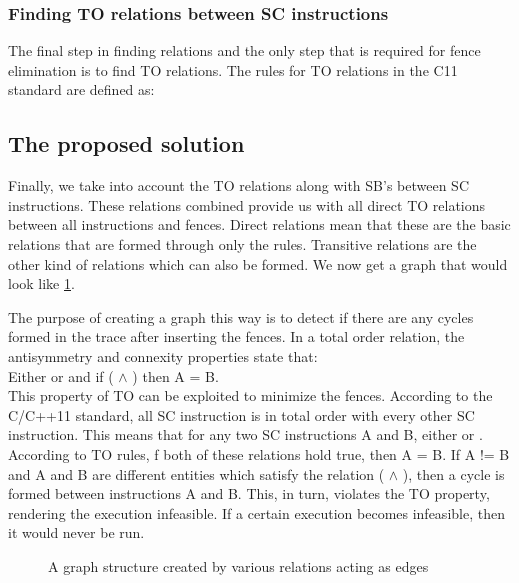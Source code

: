 \subsubsection{Finding TO relations between SC instructions}
The final step in finding relations and the only step that is required for fence elimination is to find TO relations. The rules for TO relations in the C11 standard are defined as:


\subsection{The proposed solution}
Finally, we take into account the TO relations along with SB's between SC instructions. These relations combined provide us with all direct TO relations between all instructions and fences. Direct relations mean that these are the basic relations that are formed through only the rules. Transitive relations are the other kind of relations which can also be formed. We now get a graph that would look like \ref{fig:cycles}.

\par
The purpose of creating a graph this way is to detect if there are any cycles formed in the trace after inserting the fences. In a total order relation, the antisymmetry and connexity properties state that:\\
Either  or  and if ( $\land$ ) then A = B.\\
This property of TO can be exploited to minimize the fences. According to the C/C++11 standard, all SC instruction is in total order with every other SC instruction. This means that for any two SC instructions A and B, either  or . According to TO rules, f both of these relations hold true, then A = B. If A != B and A and B are different entities which satisfy the relation ( $\land$ ), then a cycle is formed between instructions A and B. This, in turn, violates the TO property, rendering the execution infeasible. If a certain execution becomes infeasible, then it would never be run. 

\begin{figure}
\begin{center}
	
	\caption{A graph structure created by various relations acting as edges}
	\label{fig:cycles}
\end{center}
\end{figure}

